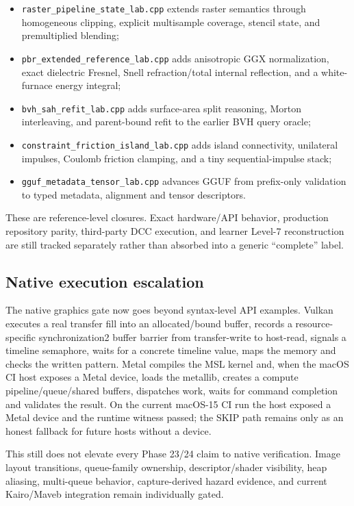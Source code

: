 \begin{itemize}
\tightlist
\item
  \texttt{raster\_pipeline\_state\_lab.cpp} extends raster semantics through homogeneous clipping, explicit multisample coverage, stencil state, and premultiplied blending;
\item
  \texttt{pbr\_extended\_reference\_lab.cpp} adds anisotropic GGX normalization, exact dielectric Fresnel, Snell refraction/total internal reflection, and a white-furnace energy integral;
\item
  \texttt{bvh\_sah\_refit\_lab.cpp} adds surface-area split reasoning, Morton interleaving, and parent-bound refit to the earlier BVH query oracle;
\item
  \texttt{constraint\_friction\_island\_lab.cpp} adds island connectivity, unilateral impulses, Coulomb friction clamping, and a tiny sequential-impulse stack;
\item
  \texttt{gguf\_metadata\_tensor\_lab.cpp} advances GGUF from prefix-only validation to typed metadata, alignment and tensor descriptors.
\end{itemize}

These are reference-level closures. Exact hardware/API behavior, production repository parity, third-party DCC execution, and learner Level-7 reconstruction are still tracked separately rather than absorbed into a generic ``complete'' label.

\subsection{Native execution escalation}\label{appendix-2358b21a702d-native-execution-escalation}

The native graphics gate now goes beyond syntax-level API examples. Vulkan executes a real transfer fill into an allocated/bound buffer, records a resource-specific synchronization2 buffer barrier from transfer-write to host-read, signals a timeline semaphore, waits for a concrete timeline value, maps the memory and checks the written pattern. Metal compiles the MSL kernel and, when the macOS CI host exposes a Metal device, loads the metallib, creates a compute pipeline/queue/shared buffers, dispatches work, waits for command completion and validates the result. On the current macOS-15 CI run the host exposed a Metal device and the runtime witness passed; the SKIP path remains only as an honest fallback for future hosts without a device.

This still does not elevate every Phase 23/24 claim to native verification. Image layout transitions, queue-family ownership, descriptor/shader visibility, heap aliasing, multi-queue behavior, capture-derived hazard evidence, and current Kairo/Maveb integration remain individually gated.


